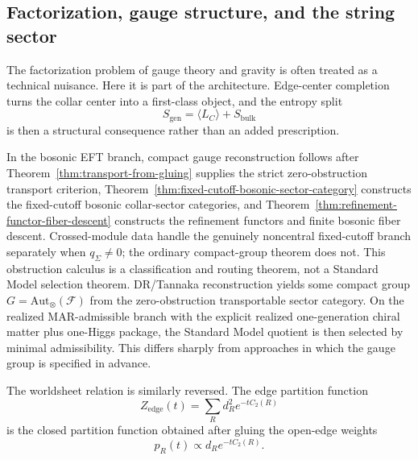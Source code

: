 \documentclass[11pt]{article}
\begin{document}
\subsection{Factorization, gauge structure, and the string sector}

The factorization problem of gauge theory and gravity is often treated as a technical nuisance. Here it is part of the architecture. Edge-center completion turns the collar center into a first-class object, and the entropy split
\[
S_{\mathrm{gen}}=\langle L_C\rangle + S_{\mathrm{bulk}}
\]
is then a structural consequence rather than an added prescription.

In the bosonic EFT branch, compact gauge reconstruction follows after Theorem~\ref{thm:transport-from-gluing} supplies the strict zero-obstruction transport criterion, Theorem~\ref{thm:fixed-cutoff-bosonic-sector-category} constructs the fixed-cutoff bosonic collar-sector categories, and Theorem~\ref{thm:refinement-functor-fiber-descent} constructs the refinement functors and finite bosonic fiber descent. Crossed-module data handle the genuinely noncentral fixed-cutoff branch separately when \(q_\Sigma\ne0\); the ordinary compact-group theorem does not. This obstruction calculus is a classification and routing theorem, not a Standard Model selection theorem. DR/Tannaka reconstruction yields some compact group \(G=\mathrm{Aut}_\otimes(\mathcal F)\) from the zero-obstruction transportable sector category. On the realized MAR-admissible branch with the explicit realized one-generation chiral matter plus one-Higgs package, the Standard Model quotient is then selected by minimal admissibility. This differs sharply from approaches in which the gauge group is specified in advance.

The worldsheet relation is similarly reversed. The edge partition function
\[
Z_{\mathrm{edge}}(t)=\sum_R d_R^2 e^{-t C_2(R)}
\]
is the closed partition function obtained after gluing the open-edge weights
\[
p_R(t)\propto d_R e^{-tC_2(R)}.
\]
\end{document}
